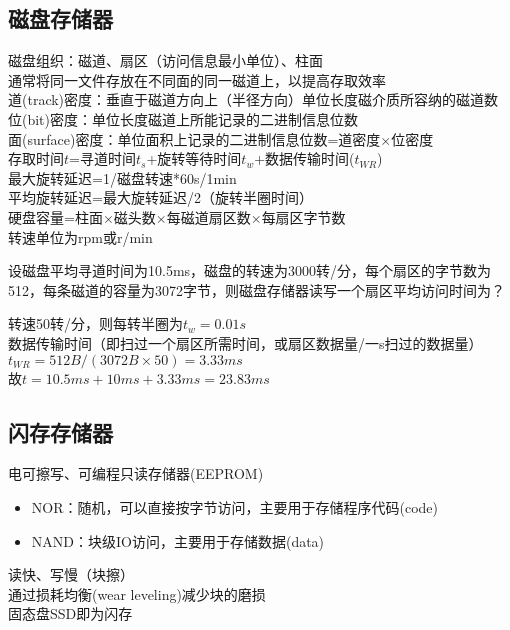 \subsection{磁盘存储器}
磁盘组织：磁道、扇区（访问信息最小单位）、柱面\\
通常将同一文件存放在不同面的同一磁道上，以提高存取效率\\
道(track)密度：垂直于磁道方向上（半径方向）单位长度磁介质所容纳的磁道数\\
位(bit)密度：单位长度磁道上所能记录的二进制信息位数\\
面(surface)密度：单位面积上记录的二进制信息位数=道密度$\times$位密度\\
存取时间$t$=寻道时间$t_s$+旋转等待时间$t_w$+数据传输时间($t_{WR}$)\\
最大旋转延迟=1/磁盘转速*60s/1min\\
平均旋转延迟=最大旋转延迟/2（旋转半圈时间）\\
硬盘容量=柱面$\times$磁头数$\times$每磁道扇区数$\times$每扇区字节数\\
转速单位为rpm或r/min
\begin{example}
设磁盘平均寻道时间为10.5ms，磁盘的转速为3000转/分，每个扇区的字节数为512，每条磁道的容量为3072字节，则磁盘存储器读写一个扇区平均访问时间为？
\end{example}
\begin{analysis}
转速50转/分，则每转半圈为$t_w=0.01s$\\
数据传输时间（即扫过一个扇区所需时间，或扇区数据量/一s扫过的数据量）$t_{WR}=512B/(3072B\times 50)=3.33ms$\\
故$t=10.5ms+10ms+3.33ms=23.83ms$
\end{analysis}

\subsection{闪存存储器}
电可擦写、可编程只读存储器(EEPROM)
\begin{itemize}
	\item NOR：随机，可以直接按字节访问，主要用于存储程序代码(code)
	\item NAND：块级IO访问，主要用于存储数据(data)
\end{itemize}
读快、写慢（块擦）\\
通过损耗均衡(wear leveling)减少块的磨损\\
固态盘SSD即为闪存

